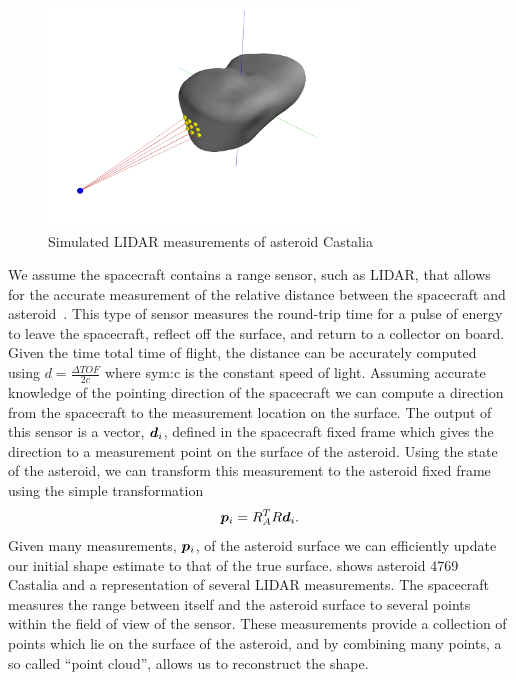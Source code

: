 \begin{figure}
    \centering
    \includegraphics[width=0.75\textwidth]{figures/2018_SSPI/castalia_raycasting_plot.jpg}
    \caption{Simulated LIDAR measurements of asteroid Castalia~\label{fig:lidar_example}}
\end{figure}
We assume the spacecraft contains a range sensor, such as LIDAR, that allows for the accurate measurement of the relative distance between the spacecraft and asteroid~\cite{zuber1997,zuber2000}.
This type of sensor measures the round-trip time for a pulse of energy to leave the spacecraft, reflect off the surface, and return to a collector on board.
Given the time total time of flight, the distance can be accurately computed using \( d = \frac{\Delta TOF}{2 c} \) where \gls{sym:c} is the constant speed of light.
Assuming accurate knowledge of the pointing direction of the spacecraft we can compute a direction from the spacecraft to the measurement location on the surface.
The output of this sensor is a vector, \( \bm{d}_i \), defined in the spacecraft fixed frame which gives the direction to a measurement point on the surface of the asteroid. 
Using the state of the asteroid, we can transform this measurement to the asteroid fixed frame using the simple transformation
\begin{align*}
    \bm{p}_i = R_A^T R \bm{d}_i .
\end{align*}
Given many measurements, \( \bm{p}_i \), of the asteroid surface we can efficiently update our initial shape estimate to that of the true surface.
 shows asteroid 4769 Castalia and a representation of several LIDAR measurements. 
The spacecraft measures the range between itself and the asteroid surface to several points within the field of view of the sensor. 
These measurements provide a collection of points which lie on the surface of the asteroid, and by combining many points, a so called ``point cloud'', allows us to reconstruct the shape.

